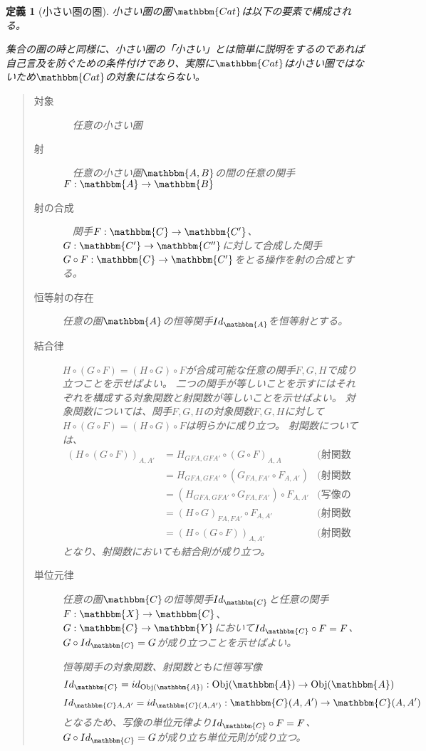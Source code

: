 \documentclass[dvipdfmx]{jsarticle}
\newcommand{\cat}[1]{\mathbbm{#1}}
\newcommand{\arrow}{\rightarrow}
\newcommand{\functor}[3]{#1:\cat{#2}\arrow \cat{#3}}
\newcommand{\obj}[1]{\mathrm{Obj}(\cat{#1})}
\newcommand{\mor}[3]{#1:#2\arrow #3}
\newcommand{\arset}[3]{\cat{#1}(#2,#3)}
\newtheorem{define}{定義}[section]
\numberwithin{proof}{subsection}
\numberwithin{prop}{subsection}
\numberwithin{define}{subsection}
\begin{document}
	\begin{define}[小さい圏の圏]
		小さい圏の圏$\cat{Cat}$は以下の要素で構成される。

		集合の圏の時と同様に、小さい圏の「小さい」とは簡単に説明をするのであれば自己言及を防ぐための条件付けであり、実際に$\cat{Cat}$は小さい圏ではないため$\cat{Cat}$の対象にはならない。
		\begin{quote}
			\begin{description}
				\item[対象]　任意の小さい圏
				\item[射]　任意の小さい圏$\cat{A,B}$の間の任意の関手$\functor{F}{A}{B}$
				\item[射の合成]　関手$\functor{F}{C}{C'}$、$\functor{G}{C'}{C''}$に対して合成した関手$\functor{G\circ F}{C}{C'}$をとる操作を射の合成とする。
				\item[恒等射の存在]任意の圏$\cat{A}$の恒等関手$Id_{\cat{A}}$を恒等射とする。
				\item[結合律]
				$H\circ (G\circ F)=(H\circ G)\circ F$が合成可能な任意の関手$F,G,H$で成り立つことを示せばよい。
				二つの関手が等しいことを示すにはそれぞれを構成する対象関数と射関数が等しいことを示せばよい。
				対象関数については、関手$F,G,H$の対象関数$F,G,H$に対して$H\circ (G\circ F)=(H\circ G)\circ F$は明らかに成り立つ。
				射関数については、
				\begin{align*}
					(H\circ (G\circ F))_{A,A'}&=H_{GFA,GFA'}\circ (G\circ F)_{A,A}&\text{(射関数の合成の定義)}\\
					&=H_{GFA,GFA'}\circ (G_{FA,FA'}\circ F_{A,A'})&\text{(射関数の合成の定義)}\\
					&=(H_{GFA,GFA'}\circ G_{FA,FA'})\circ F_{A,A'}&\text{(写像の結合則)}\\
					&=(H\circ G)_{FA,FA'}\circ F_{A,A'}&\text{(射関数の合成の定義)}\\
					&=(H\circ (G\circ F))_{A,A'}&\text{(射関数の合成の定義)}
				\end{align*}
				となり、射関数においても結合則が成り立つ。
				\item[単位元律]
				任意の圏$\cat{C}$の恒等関手$Id_{\cat{C}}$と任意の関手$\functor{F}{X}{C}$、$\functor{G}{C}{Y}$において$Id_{\cat{C}}\circ F=F$、$G\circ Id_{\cat{C}}=G$が成り立つことを示せばよい。

				恒等関手の対象関数、射関数ともに恒等写像
				\[\mor{Id_\cat{C}=id_{\obj{A}}}{\obj{A}}{\obj{A}}\]
				\[\mor{Id_{\cat{C}A,A'}=id_{\arset{C}{A}{A'}}}{\arset{C}{A}{A'}}{\arset{C}{A}{A'}}\]
				となるため、写像の単位元律より$Id_{\cat{C}}\circ F=F$、$G\circ Id_{\cat{C}}=G$が成り立ち単位元則が成り立つ。
			\end{description}
		\end{quote}
	\end{define}
\end{document}
